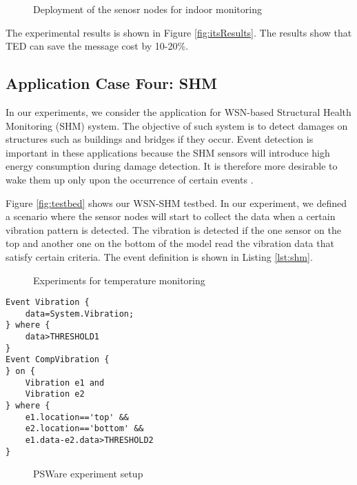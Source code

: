 \begin{figure}
\centering
{}
\caption{Deployment of the senosr nodes for indoor monitoring}
\label{fig:indoorDeployment}
\end{figure}

The experimental results is shown in Figure \ref{fig:itsResults}. The results show that TED can save the message cost by 10-20\%.

\subsection{Application Case Four: SHM}
In our experiments, we consider the application for WSN-based Structural Health Monitoring (SHM) system. The objective of such system is to detect damages on structures such as buildings and bridges if they occur. Event detection is important in these applications because the SHM sensors will introduce high energy consumption during damage detection. It is therefore more desirable to wake them up only upon the occurrence of certain events \cite{jangshm}.

Figure \ref{fig:testbed} shows our WSN-SHM testbed. In our experiment, we defined a scenario where the sensor nodes will start to collect the data when a certain vibration pattern is detected. The vibration is detected if the one sensor on the top and another one on the bottom of the model read the vibration data that satisfy certain criteria. The event definition is shown in Listing \ref{lst:shm}.

\begin{figure}
\centering
{}
\caption{Experiments for temperature monitoring}
\label{fig:indoorResult}
\end{figure}

\begin{lstlisting}[caption=Event definition for SHM, label=lst:shm]
Event Vibration {
	data=System.Vibration;
} where {
	data>THRESHOLD1
}
Event CompVibration {
} on {
	Vibration e1 and
	Vibration e2
} where {
	e1.location=='top' &&
	e2.location=='bottom' &&
	e1.data-e2.data>THRESHOLD2
}
\end{lstlisting}

\begin{figure}
\centering
{}
\caption{PSWare experiment setup}
\label{fig:experimentSetup}
\end{figure}

